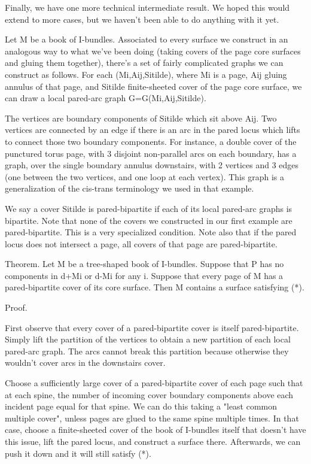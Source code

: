 \documentclass[12pt]{amsart}
\theoremstyle{definition}
\begin{document}
Finally, we have one more technical intermediate result. We hoped this would
extend to more cases, but we haven't been able to do anything with it yet.

Let M be a book of I-bundles. Associated to every surface we construct in an
analogous way to what we've been doing (taking covers of the page core surfaces
and gluing them together), there's a set of fairly complicated graphs we can
construct as follows. For each (Mi,Aij,Sitilde), where Mi is a page, Aij gluing
annulus of that page, and Sitilde finite-sheeted cover of the page core
surface, we can draw a local pared-arc graph G=G(Mi,Aij,Sitilde).

The vertices are boundary components of Sitilde which sit above Aij. Two
vertices are connected by an edge if there is an arc in the pared locus which
lifts to connect those two boundary components. For instance, a double cover of
the punctured torus page, with 3 disjoint non-parallel arcs on each boundary,
has a graph, over the single boundary annulus downstairs,  with 2 vertices and
3 edges (one between the two vertices, and one loop at each vertex). This graph
is a generalization of the cis-trans terminology we used in that example.

We say a cover Sitilde is pared-bipartite if each of its local pared-arc
graphs is bipartite. Note that none of the covers we constructed in our first
example are pared-bipartite. This is a very specialized condition. Note also
that if the pared locus does not intersect a page, all covers of that page are
pared-bipartite.

Theorem. Let M be a tree-shaped book of I-bundles. Suppose that P has no
components in d+Mi or d-Mi for any i. Suppose that every page of M has
a pared-bipartite cover of its core surface. Then M contains a surface
satisfying (*).

Proof.

First observe that every cover of a pared-bipartite cover is itself
pared-bipartite. Simply lift the partition of the vertices to obtain a new
partition of each local pared-arc graph. The arcs cannot break this
partition because otherwise they wouldn't cover arcs in the downstairs cover.

Choose a sufficiently large cover of a pared-bipartite cover of each page such
that at each spine, the number of incoming cover boundary components above each
incident page equal for that spine. We can do this taking a "least common
multiple cover", unless pages are glued to the same spine multiple times. In
that case, choose a finite-sheeted cover of the book of I-bundles itself that
doesn't have this issue, lift the pared locus, and construct a surface there.
Afterwards, we can push it down and it will still satisfy (*).
\end{document}
